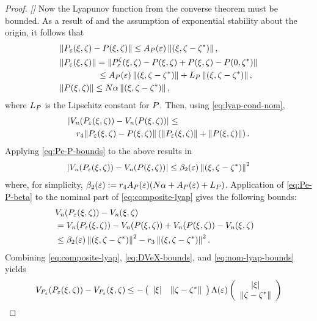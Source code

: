 \begin{proof}{\em []}
  Now the Lyapunov function from the converse theorem must be bounded.
  As a result of  and the assumption of exponential
  stability about the origin, it follows that
  \begin{align}
    \label{eq:Pe-P-bounds}
    &\| \Pe\argsxz - \P\argsxz \| \leq \Ae \nzdxzst,\\
    \nonumber
    &\| \Pe\argsxz \| = \| \Pez\argsxz - \P\argsxz + \P\argsxz - \P\xzst\|\\
    \nonumber
    & \hspace{4.4em} \leq \Ae \nzdxzst  + \LP\nzdxzst,\\
    \nonumber
    &\| \P\argsxz \| \leq N \alpha \nzdxzst,
  \end{align}
  where $\LP$ is the Lipschitz constant for $\P$.
  Then, using \eqref{eq:lyap-cond-nom},
  \begin{align*}
    \lefteqn{| \Vn(\Pe\argsxz) - \Vn(\P\argsxz) | \leq}\\
    &&r_{4} \| \Pe\argsxz - \P\argsxz \| \left( \|\Pe\argsxz\| + \|\P\argsxz\|
    \right).
  \end{align*}
  Applying \eqref{eq:Pe-P-bounds} to the above results in
  \begin{align}
    \label{eq:Pe-P-beta}
    | \Vn(\Pe\argsxz) - \Vn(\P\argsxz) | \leq \bepstwo \nzdxzst^{2}
  \end{align}
  where, for simplicity, $\bepstwo := r_{4} \Ae (N \alpha + \Ae  + \LP)$.
  Application of \eqref{eq:Pe-P-beta} to the nominal part of
  \eqref{eq:composite-lyap} gives the following bounds:
  \begin{align}
    \label{eq:nom-lyap-bounds}
    \lefteqn{\Vn(\Pe\argsxz) - \Vn\argsxz }\\
    \nonumber
    &= \Vn(\Pe\argsxz) - \Vn(\P\argsxz) + \Vn(\P\argsxz) - \Vn\argsxz\\
    \nonumber
    &\leq \bepstwo \nzdxzst^{2} - r_{3} \nzdxzst^{2}.
  \end{align}
  Combining \eqref{eq:composite-lyap}, \eqref{eq:DVeX-bounds}, and
  \eqref{eq:nom-lyap-bounds} yields
  \begin{align*}
    \VP(\Pe\argsxz) - \VP\argsxz \leq - \left(\begin{array}{c c}
      \nzdx & \nzdzst
    \end{array}\right)
    \Le
    \left(\begin{array}{c}
      \nzdx\\
      \nzdzst
    \end{array}\right)

\end{align*}
\end{proof}
